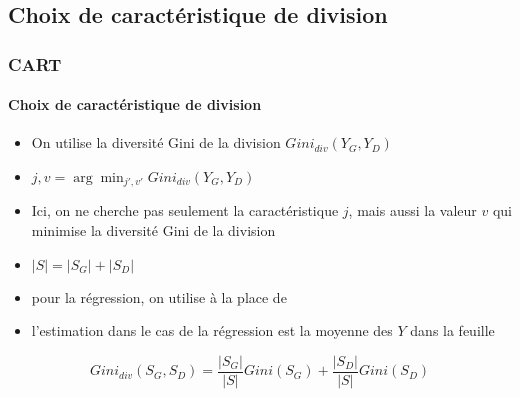 \documentclass[xcolor=table]{beamer}
\begin{document}
\subsection{Choix de caractéristique de division}

\begin{frame}
	\frametitle{CART}
	\framesubtitle{Choix de caractéristique de division}
	
	\begin{itemize}
		\item On utilise la diversité Gini de la division $Gini_{div}(Y_G, Y_D)$
		\item $j, v = \arg\min_{j', v'} Gini_{div}(Y_G, Y_D)$
		\item Ici, on ne cherche pas seulement la caractéristique $j$, mais aussi la valeur $v$ qui minimise la diversité Gini de la division
		\item $|S| = |S_G| + |S_D|$
		\item pour la régression, on utilise  à la place de 
		\item l'estimation dans le cas de la régression est la moyenne des $Y$ dans la feuille
	\end{itemize}
	
	\[Gini_{div}(S_G, S_D) = \frac{|S_G|}{|S|} Gini(S_G) + \frac{|S_D|}{|S|} Gini(S_D)\]
	
	
\end{frame}

\end{document}
